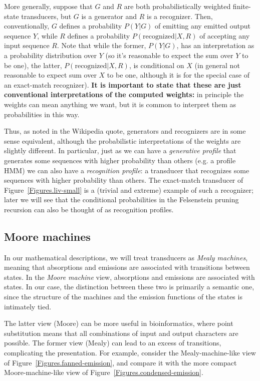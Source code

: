 \documentclass{article}
\newcommand{\figref}[1]{Figure~\ref{Figures.#1}}
\begin{document}
More generally, suppose that $G$ and $R$ are both probabilistically weighted finite-state transducers,
but $G$ is a generator and $R$ is a recognizer.
Then, conventionally, $G$ defines a probability $P(Y|G)$ of emitting any emitted output sequence $Y$,
while $R$ defines a probability $P(\mbox{recognized}|X,R)$ of accepting any input sequence $R$.
Note that while the former, $P(Y|G)$, has an interpretation as a probability distribution over $Y$
(so it's reasonable to expect the sum over $Y$ to be one),
the latter, $P(\mbox{recognized}|X,R)$, is conditional on $X$
(in general not reasonable to expect sum over $X$ to be one,
although it is for the special case of an exact-match recognizer).
{\bf It is important to state that these are just conventional interpretations of the computed weights:}
in principle the weights can mean anything we want,
but it is common to interpret them as probabilities in this way.

Thus, as noted in the Wikipedia quote, generators and recognizers are in some sense equivalent,
although the probabilistic interpretations of the weights are slightly different.
In particular, just as we can have a {\em generative profile}
that generates some sequences with higher probability than others (e.g. a profile HMM)
we can also have a {\em recognition profile}: a transducer
that recognizes some sequences with higher probability than others.
The exact-match transducer of \figref{liv-small} is a (trivial and extreme) example of such a recognizer;
later we will see that the conditional probabilities in the Felsenstein pruning recursion can also
be thought of as recognition profiles.

\subsection{Moore machines}

In our mathematical descriptions, we will treat transducers as
{\em Mealy machines}, meaning that absorptions and emissions are associated with transitions between states.  
In the {\em Moore machine} view, absorptions and emissions are associated with states.  
In our case, the distinction between these two is primarily a semantic one, since the structure 
of the machines and the emission functions of the states is intimately tied.

The latter view (Moore) can be more useful in bioinformatics,
where point substitution means that all combinations of input and output characters 
are possible.  
The former view (Mealy) can lead to an excess of transitions, complicating the presentation.  
For example, consider the Mealy-machine-like view of  \figref{fanned-emission},
and compare it with the more compact Moore-machine-like view of \figref{condensed-emission}.  
\end{document}

